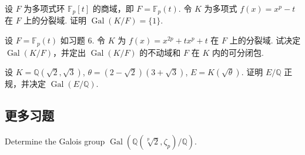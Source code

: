 \setcounter{pb}{6}
\begin{problem}
    设 $ F $ 为多项式环 $ \mathbb{F}_p[t] $ 的商域，即 $ F = \mathbb{F}_p(t) $. 
    令 $ K $ 为多项式 $ f(x) = x^p - t $ 在 $ F $ 上的分裂域. 
    证明 $ \operatorname{Gal}(K/F) = \{1\} $.
\end{problem}

\begin{problem}
    设 $ F = \mathbb{F}_p(t) $ 如习题 6. 
    令 $ K $ 为 $ f(x) = x^{2p} + t x^p + t $ 在 $ F $ 上的分裂域. 
    试决定 $ \operatorname{Gal}(K/F) $，并定出 $ \operatorname{Gal}(K/F) $ 的不动域和 $ F $ 在 $ K $ 内的可分闭包. 
\end{problem}

\setcounter{pb}{14}
\begin{problem}
    设 $ K = \mathbb{Q}(\sqrt{2}, \sqrt{3}) $, $ \theta = (2 - \sqrt{2})(3 + \sqrt{3}) $, $ E = K(\sqrt{\theta}) $.
    证明 $ E/\mathbb{Q} $ 正规，并决定 $ \operatorname{Gal}(E/\mathbb{Q}) $.
\end{problem}


\subsection{更多习题}

\setcounter{pb}{26}
\begin{problem}
    Determine the Galois group $ \operatorname{Gal}(\mathbb{Q}(\sqrt[p]{2}, \zeta_p)/\mathbb{Q}) $.
\end{problem}

